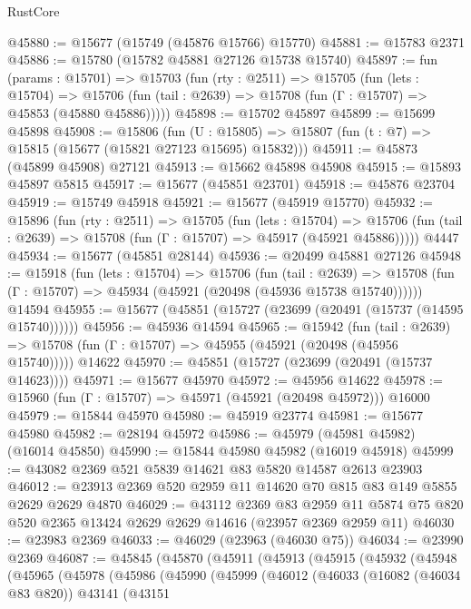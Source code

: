 \begin{lexlean}{RustCore}
\begin{coremodule}
@45880 := @15677 (@15749 (@45876 @15766) @15770)
@45881 := @15783 @2371
@45886 := @15780 (@15782 @45881 @27126 @15738 @15740)
@45897 := fun (params : @15701) =>
  @15703
    (fun (rty : @2511) =>
    @15705
      (fun (lets : @15704) =>
      @15706 (fun (tail : @2639) => @15708 (fun (Γ : @15707) => @45853 (@45880 @45886)))))
@45898 := @15702 @45897
@45899 := @15699 @45898
@45908 := @15806
    (fun (U : @15805) => @15807 (fun (t : @7) => @15815 (@15677 (@15821 @27123 @15695) @15832)))
@45911 := @45873 (@45899 @45908) @27121
@45913 := @15662 @45898 @45908
@45915 := @15893 @45897 @5815
@45917 := @15677 (@45851 @23701)
@45918 := @45876 @23704
@45919 := @15749 @45918
@45921 := @15677 (@45919 @15770)
@45932 := @15896
    (fun (rty : @2511) =>
    @15705
      (fun (lets : @15704) =>
      @15706 (fun (tail : @2639) => @15708 (fun (Γ : @15707) => @45917 (@45921 @45886)))))
    @4447
@45934 := @15677 (@45851 @28144)
@45936 := @20499 @45881 @27126
@45948 := @15918
    (fun (lets : @15704) =>
    @15706
      (fun (tail : @2639) =>
      @15708 (fun (Γ : @15707) => @45934 (@45921 (@20498 (@45936 @15738 @15740))))))
    @14594
@45955 := @15677 (@45851 (@15727 (@23699 (@20491 (@15737 (@14595 @15740))))))
@45956 := @45936 @14594
@45965 := @15942
    (fun (tail : @2639) => @15708 (fun (Γ : @15707) => @45955 (@45921 (@20498 (@45956 @15740)))))
    @14622
@45970 := @45851 (@15727 (@23699 (@20491 (@15737 @14623))))
@45971 := @15677 @45970
@45972 := @45956 @14622
@45978 := @15960 (fun (Γ : @15707) => @45971 (@45921 (@20498 @45972))) @16000
@45979 := @15844 @45970
@45980 := @45919 @23774
@45981 := @15677 @45980
@45982 := @28194 @45972
@45986 := @45979 (@45981 @45982) (@16014 @45850)
@45990 := @15844 @45980 @45982 (@16019 @45918)
@45999 := @43082 @2369 @521 @5839 @14621 @83 @5820 @14587 @2613 @23903
@46012 := @23913 @2369 @520 @2959 @11 @14620 @70 @815 @83 @149 @5855 @2629 @2629 @4870
@46029 := @43112
    @2369
    @83
    @2959
    @11
    @5874
    @75
    @820
    @520
    @2365
    @13424
    @2629
    @2629
    @14616
    (@23957 @2369 @2959 @11)
@46030 := @23983 @2369
@46033 := @46029 (@23963 (@46030 @75))
@46034 := @23990 @2369
@46087 := @45845
    (@45870
      (@45911
        (@45913
          (@45915
            (@45932
              (@45948
                (@45965
                  (@45978
                    (@45986
                      (@45990
                        (@45999
                          (@46012
                            (@46033
                              (@16082 (@46034 @83 @820))
                              @43141
                              (@43151

\end{coremodule}
\end{lexlean}
